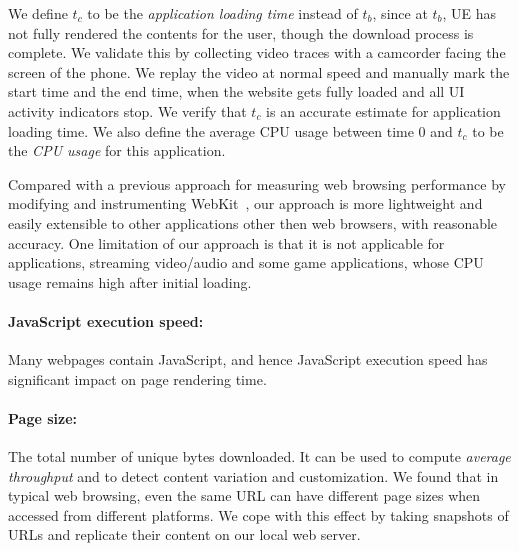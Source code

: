 We define $t_c$ to be the {\em application loading time} instead of $t_b$, since at $t_b$, UE has not fully rendered the contents for the user, though the download process is complete. We validate this by collecting video traces with a camcorder facing the screen of the phone. We replay the video at normal speed and manually mark the start time and the end time, when the website gets fully loaded and all UI activity indicators stop. We verify that $t_c$ is an accurate estimate for application loading time. We also define the average CPU usage between time 0 and $t_c$ to be the {\em CPU usage} for this application.

Compared with a previous approach for measuring web browsing performance by modifying and instrumenting WebKit~\cite{hotmobile.web}, our approach is more lightweight and easily extensible to other applications other then web browsers, with reasonable accuracy. One limitation of our approach is that it is not applicable for applications, \eg streaming video/audio and some game applications, whose CPU usage remains high after initial loading.

\paragraph{JavaScript execution speed:} Many webpages contain 
JavaScript, and hence JavaScript execution speed has significant
impact on page rendering time. 



\paragraph{Page size:} The total number of unique bytes downloaded. 
It can be used to compute {\it average throughput} and to detect 
content variation and customization. 
We found that in typical web browsing, even the same URL can have different 
page sizes when accessed from different platforms. We cope with this 
effect by taking snapshots of URLs and replicate their content on our 
local web server.



